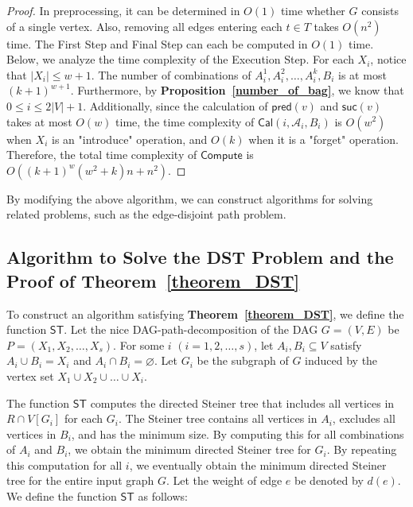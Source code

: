 \documentclass[runningheads]{llncs}
\theoremstyle{plain}
\theoremstyle{definition}
\begin{document}
\begin{proof}
    In preprocessing, it can be determined in $O(1)$ time whether $G$ consists of a single vertex. Also, removing all edges entering each $t \in T$ takes $O(n^2)$ time. The First Step and Final Step can each be computed in $O(1)$ time. Below, we analyze the time complexity of the Execution Step. For each $X_i$, notice that $|X_i| \leq w+1$. The number of combinations of $A^1_i, A^2_i, \dots, A^k_i, B_i$ is at most $(k+1)^{w+1}$. Furthermore, by \textbf{Proposition~\ref{number_of_bag}}, we know that $0 \leq i \leq 2|V|+1$. Additionally, since the calculation of $\mathsf{pred}(v)$ and $\mathsf{suc}(v)$ takes at most $O(w)$ time, the time complexity of $\mathsf{Cal}(i, \mathscr{A}_i, B_i)$ is $O(w^2)$ when $X_i$ is an "introduce" operation, and $O(k)$ when it is a "forget" operation. Therefore, the total time complexity of $\mathsf{Compute}$ is $O((k+1)^w(w^2+k)n+n^2)$.
\end{proof}

By modifying the above algorithm, we can construct algorithms for solving related problems, such as the edge-disjoint path problem.






\subsection{Algorithm to Solve the DST Problem and the Proof of \textbf{Theorem~\ref{theorem_DST}}}\label{appendix_B7}

To construct an algorithm satisfying \textbf{Theorem~\ref{theorem_DST}}, we define the function $\mathsf{ST}$. Let the nice DAG-path-decomposition of the DAG $G = (V, E)$ be $P = (X_1, X_2, \dots, X_s)$. For some $i$ $(i = 1, 2, \dots, s)$, let $A_i, B_i \subseteq V$ satisfy $A_i \cup B_i = X_i$ and $A_i \cap B_i = \varnothing$. Let $G_i$ be the subgraph of $G$ induced by the vertex set $X_1 \cup X_2 \cup \dots \cup X_i$.

The function $\mathsf{ST}$ computes the directed Steiner tree that includes all vertices in $R \cap V[G_i]$ for each $G_i$. The Steiner tree contains all vertices in $A_i$, excludes all vertices in $B_i$, and has the minimum size. By computing this for all combinations of $A_i$ and $B_i$, we obtain the minimum directed Steiner tree for $G_i$. By repeating this computation for all $i$, we eventually obtain the minimum directed Steiner tree for the entire input graph $G$. Let the weight of edge $e$ be denoted by $d(e)$. We define the function $\mathsf{ST}$ as follows:
\end{document}

